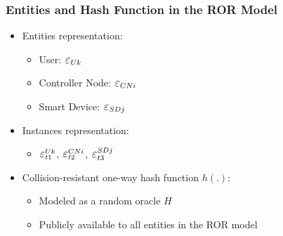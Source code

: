 \documentclass[9pt,handout]{beamer}
\begin{document}
\begin{frame}
    \frametitle{Entities and Hash Function in the ROR Model}
    \begin{itemize}
        \item Entities representation:
            \begin{itemize}
                \item User: \( \text{\large $\varepsilon$}_{Uk} \)
                \item Controller Node: \( \text{\large $\varepsilon$}_{CNi} \)
                \item Smart Device: \( \text{\large $\varepsilon$}_{SDj} \)
            \end{itemize}
        \item Instances representation:
            \begin{itemize}
                \item \( \text{\large $\varepsilon$}_{t1}^{Uk} \), \( \text{\large $\varepsilon$}_{t2}^{CNi} \), \( \text{\large $\varepsilon$}_{t3}^{SDj} \)
            \end{itemize}
         \item Collision-resistant one-way hash function \( h(.) \):
            \begin{itemize}
                \item Modeled as a random oracle \( H \)
                \item Publicly available to all entities in the ROR model
            \end{itemize}
    \end{itemize}
\end{frame}
\end{document}
